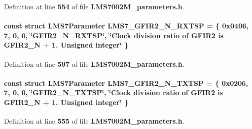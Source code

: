 Definition at line {\bf 554} of file {\bf L\+M\+S7002\+M\+\_\+parameters.\+h}.

\paragraph[{L\+M\+S7\+\_\+\+G\+F\+I\+R2\+\_\+\+N\+\_\+\+R\+X\+T\+SP}]{\setlength{\rightskip}{0pt plus 5cm}const struct {\bf L\+M\+S7\+Parameter} L\+M\+S7\+\_\+\+G\+F\+I\+R2\+\_\+\+N\+\_\+\+R\+X\+T\+SP = \{ 0x0406, 7, 0, 0, \char`\"{}\+G\+F\+I\+R2\+\_\+\+N\+\_\+\+R\+X\+T\+S\+P\char`\"{}, \char`\"{}\+Clock division ratio of G\+F\+I\+R2 is G\+F\+I\+R2\+\_\+\+N + 1. Unsigned integer\char`\"{} \}\hspace{0.3cm}{\ttfamily [static]}}\label{LMS7002M__parameters_8h_afeed18d27536bf80fcecf8df74c699eb}


Definition at line {\bf 597} of file {\bf L\+M\+S7002\+M\+\_\+parameters.\+h}.

\paragraph[{L\+M\+S7\+\_\+\+G\+F\+I\+R2\+\_\+\+N\+\_\+\+T\+X\+T\+SP}]{\setlength{\rightskip}{0pt plus 5cm}const struct {\bf L\+M\+S7\+Parameter} L\+M\+S7\+\_\+\+G\+F\+I\+R2\+\_\+\+N\+\_\+\+T\+X\+T\+SP = \{ 0x0206, 7, 0, 0, \char`\"{}\+G\+F\+I\+R2\+\_\+\+N\+\_\+\+T\+X\+T\+S\+P\char`\"{}, \char`\"{}\+Clock division ratio of G\+F\+I\+R2 is G\+F\+I\+R2\+\_\+\+N + 1. Unsigned integer\char`\"{} \}\hspace{0.3cm}{\ttfamily [static]}}\label{LMS7002M__parameters_8h_a4c4464d869a194d7c649cc767d7a24da}


Definition at line {\bf 555} of file {\bf L\+M\+S7002\+M\+\_\+parameters.\+h}.

